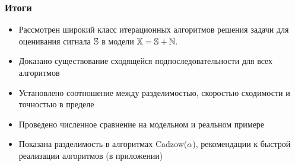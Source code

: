 \documentclass[unicode, notheorems]{beamer}
\begin{document}

\begin{frame}
	\frametitle{Итоги}
	\begin{itemize}
		\item Рассмотрен широкий класс итерационных алгоритмов решения задачи 
		для оценивания сигнала $\mathbb{S}$  в модели $\mathbb{X} = \mathbb{S} + \mathbb{N}$.
		\item Доказано существование сходящейся подпоследовательности для всех алгоритмов
		\item Установлено соотношение между разделимостью, скоростью сходимости и точностью в пределе
		\item Проведено численное сравнение на модельном и реальном примере
		\item Показана разделимость в алгоритмах Cadzow($\alpha$), рекомендации к быстрой реализации алгоритмов (в приложении)
	\end{itemize}
	
\end{frame}


\end{document}
